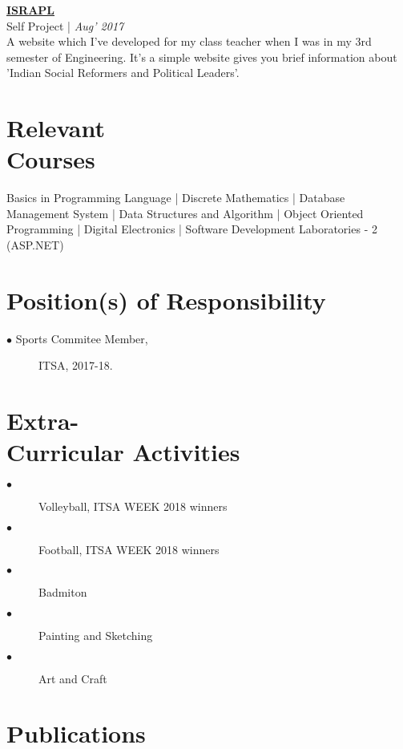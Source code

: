 \documentclass[margin,line]{res}
\begin{document}
\begin{resume}
\href{https://github.com/PurveshMakode24/ISRAPL}{\bf ISRAPL}\\
{\small Self Project |} {\em \small Aug' 2017 }\\
A website which I've developed for my class teacher when I was in my 3rd semester of Engineering. It's a simple website gives you brief information about 'Indian Social Reformers and Political Leaders'.
\vspace{0.3cm}

\section{\sc Relevant\\ Courses}
Basics in Programming Language | Discrete Mathematics | Database Management System | Data Structures and Algorithm | Object Oriented Programming | Digital Electronics | Software Development Laboratories - 2 (ASP.NET)
\vspace{0.3cm}

\section{\sc Position(s) of Responsibility}
 
 \begin{description}
  \item[$\bullet$ Sports Commitee Member,]  ITSA, 2017-18.\\
 
\end{description}


\section{\sc Extra-\\Curricular Activities}
  \begin{description}
   \item[$\bullet$] Volleyball, {\small ITSA WEEK 2018 winners}
   \item[$\bullet$] Football, {\small ITSA WEEK 2018 winners}
   \item[$\bullet$] Badmiton
   \item[$\bullet$] Painting and Sketching
   \item[$\bullet$] Art and Craft
\end{description}



\iffalse
\section{\sc Publications}


\end{resume}
\end{document}
